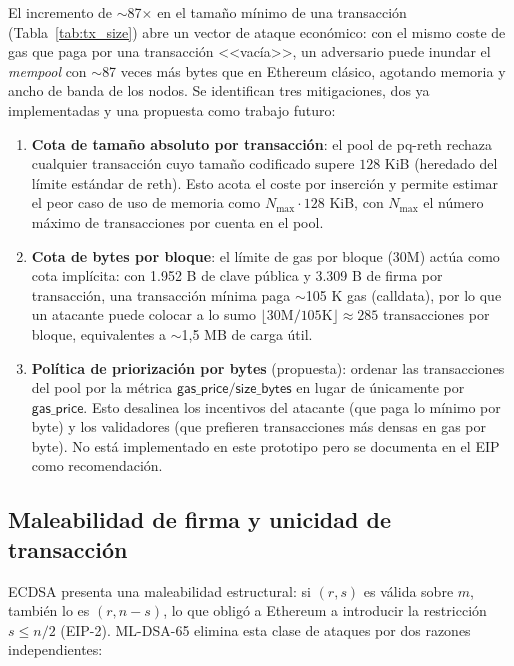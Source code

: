 El incremento de $\sim$87$\times$ en el tamaño mínimo de una transacción (Tabla~\ref{tab:tx_size}) abre un vector de ataque económico: con el mismo coste de gas que paga por una transacción <<vacía>>, un adversario puede inundar el \emph{mempool} con $\sim$87 veces más bytes que en Ethereum clásico, agotando memoria y ancho de banda de los nodos. Se identifican tres mitigaciones, dos ya implementadas y una propuesta como trabajo futuro:

\begin{enumerate}
  \item \textbf{Cota de tamaño absoluto por transacción}: el pool de pq-reth rechaza cualquier transacción cuyo tamaño codificado supere $128$ KiB (heredado del límite estándar de reth). Esto acota el coste por inserción y permite estimar el peor caso de uso de memoria como $N_{\max} \cdot 128$ KiB, con $N_{\max}$ el número máximo de transacciones por cuenta en el pool.
  
  \item \textbf{Cota de bytes por bloque}: el límite de gas por bloque (30M) actúa como cota implícita: con 1.952 B de clave pública y 3.309 B de firma por transacción, una transacción mínima paga $\sim$105 K gas (calldata), por lo que un atacante puede colocar a lo sumo $\lfloor 30\text{M} / 105\text{K} \rfloor \approx 285$ transacciones por bloque, equivalentes a $\sim$1,5 MB de carga útil.
  
  \item \textbf{Política de priorización por bytes} (propuesta): ordenar las transacciones del pool por la métrica $\textsf{gas\_price}/\textsf{size\_bytes}$ en lugar de únicamente por $\textsf{gas\_price}$. Esto desalinea los incentivos del atacante (que paga lo mínimo por byte) y los validadores (que prefieren transacciones más densas en gas por byte). No está implementado en este prototipo pero se documenta en el EIP como recomendación.
\end{enumerate}

\subsection{Maleabilidad de firma y unicidad de transacción}
\label{sec:sec_malleability}

ECDSA presenta una maleabilidad estructural: si $(r, s)$ es válida sobre $m$, también lo es $(r, n-s)$, lo que obligó a Ethereum a introducir la restricción $s \leq n/2$ (EIP-2). ML-DSA-65 elimina esta clase de ataques por dos razones independientes:

